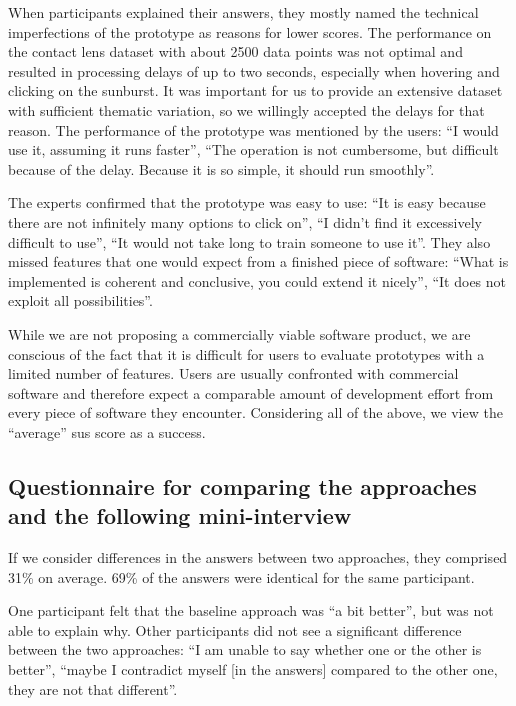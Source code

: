 When participants explained their answers, they mostly named the technical imperfections of the prototype as reasons for lower scores. 
The performance on the contact lens dataset with about 2500 data points was not optimal and resulted in processing delays of up to two seconds, especially when hovering and clicking on the sunburst. 
It was important for us to provide an extensive dataset with sufficient thematic variation, so we willingly accepted the delays for that reason.
The performance of the prototype was mentioned by the users: ``I would use it, assuming it runs faster'', ``The operation is not cumbersome, but difficult because of the delay. Because it is so simple, it should run smoothly''.

The experts confirmed that the prototype was easy to use: ``It is easy because there are not infinitely many options to click on'', ``I didn't find it excessively difficult to use'', ``It would not take long to train someone to use it''.
They also missed features that one would expect from a finished piece of software: ``What is implemented is coherent and conclusive, you could extend it nicely'', ``It does not exploit all possibilities''.

While we are not proposing a commercially viable software product, we are conscious of the fact that it is difficult for users to evaluate prototypes with a limited number of features. 
Users are usually confronted with commercial software and therefore expect a comparable amount of development effort from every piece of software they encounter.
Considering all of the above, we view the ``average'' \gls{sus} score as a success.

\subsection{Questionnaire for comparing the approaches and the following mini-interview}
\label{subsec:questionnaire_comparing_approaches}

If we consider differences in the answers between two approaches, they comprised 31\% on average.
69\% of the answers were identical for the same participant.

One participant felt that the baseline approach was ``a bit better'', but was not able to explain why.
Other participants did not see a significant difference between the two approaches: ``I am unable to say whether one or the other is better'', ``maybe I contradict myself [in the answers] compared to the other one, they are not that different''.

